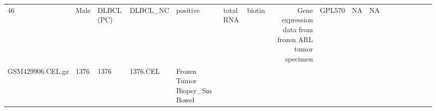 \documentclass[]{article}
\begin{document}
\begin{longtable}[]{@{}lllllllrllllllllll@{}}
\begin{minipage}[t]{0.05\columnwidth}
46\strut
\end{minipage} & \begin{minipage}[t]{0.04\columnwidth}\raggedright
Male\strut
\end{minipage} & \begin{minipage}[t]{0.06\columnwidth}\raggedright
DLBCL (PC)\strut
\end{minipage} & \begin{minipage}[t]{0.06\columnwidth}\raggedright
DLBCL\_NC\strut
\end{minipage} & \begin{minipage}[t]{0.04\columnwidth}\raggedright
positive\strut
\end{minipage} & \begin{minipage}[t]{0.02\columnwidth}\raggedright
total RNA\strut
\end{minipage} & \begin{minipage}[t]{0.01\columnwidth}\raggedright
biotin\strut
\end{minipage} & \begin{minipage}[t]{0.08\columnwidth}\raggedright
Gene expression data from frozen ARL tumor specimen\strut
\end{minipage} & \begin{minipage}[t]{0.01\columnwidth}\raggedright
GPL570\strut
\end{minipage} & \begin{minipage}[t]{0.00\columnwidth}\raggedright
NA\strut
\end{minipage} & \begin{minipage}[t]{0.01\columnwidth}\raggedright
NA\strut
\end{minipage}\tabularnewline
\begin{minipage}[t]{0.03\columnwidth}\raggedright
GSM429906.CEL.gz\strut
\end{minipage} & \begin{minipage}[t]{0.02\columnwidth}\raggedright
1376\strut
\end{minipage} & \begin{minipage}[t]{0.01\columnwidth}\raggedright
1376\strut
\end{minipage} & \begin{minipage}[t]{0.02\columnwidth}\raggedright
1376.CEL\strut
\end{minipage} & \begin{minipage}[t]{0.06\columnwidth}\raggedright
Frozen Tumor Biopsy\_Sm Bowel\strut
\end{minipage} & \begin{minipage}[t]{0.02\columnwidth}\raggedright

\end{minipage}
\end{longtable}
\end{document}
